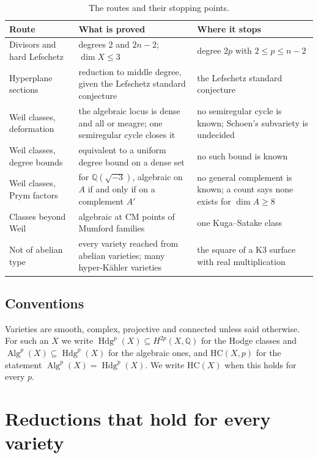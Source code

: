 \documentclass[11pt]{amsart}
\theoremstyle{definition}
\theoremstyle{remark}
\newcommand{\QQ}{\mathbb{Q}}
\newcommand{\Hdg}{\operatorname{Hdg}}
\newcommand{\Alg}{\operatorname{Alg}}
\newcommand{\HC}{\mathrm{HC}}
\begin{document}
\begin{table}[ht]
\centering
\small
\begin{tabular}{@{}>{\raggedright\arraybackslash}p{4.4cm}>{\raggedright\arraybackslash}p{4.6cm}>{\raggedright\arraybackslash}p{4.6cm}@{}}
\toprule
Route & What is proved & Where it stops\\
\midrule
Divisors and hard Lefschetz & degrees $2$ and $2n-2$; $\dim X\le3$ & degree $2p$ with $2\le p\le n-2$\\
Hyperplane sections & reduction to middle degree, given the Lefschetz standard conjecture & the Lefschetz standard conjecture\\
Weil classes, deformation & the algebraic locus is dense and all or meagre; one semiregular cycle closes it & no semiregular cycle is known; Schoen's subvariety is undecided\\
Weil classes, degree bounds & equivalent to a uniform degree bound on a dense set & no such bound is known\\
Weil classes, Prym factors & for $\QQ(\sqrt{-3})$, algebraic on $A$ if and only if on a complement $A'$ & no general complement is known; a count says none exists for $\dim A\ge8$\\
Classes beyond Weil & algebraic at CM points of Mumford families & one Kuga--Satake class\\
Not of abelian type & every variety reached from abelian varieties; many hyper-K\"ahler varieties & the square of a K3 surface with real multiplication\\
\bottomrule
\end{tabular}
\caption{The routes and their stopping points.}\label{tab:routes}
\end{table}

\subsection*{Conventions}
Varieties are smooth, complex, projective and connected unless said
otherwise. For such an $X$ we write $\Hdg^{p}(X)\subseteq H^{2p}(X,\QQ)$ for
the Hodge classes and $\Alg^{p}(X)\subseteq\Hdg^{p}(X)$ for the algebraic
ones, and $\HC(X,p)$ for the statement $\Alg^{p}(X)=\Hdg^{p}(X)$. We write
$\HC(X)$ when this holds for every $p$.

\section{Reductions that hold for every variety}\label{sec:reductions}
\end{document}
